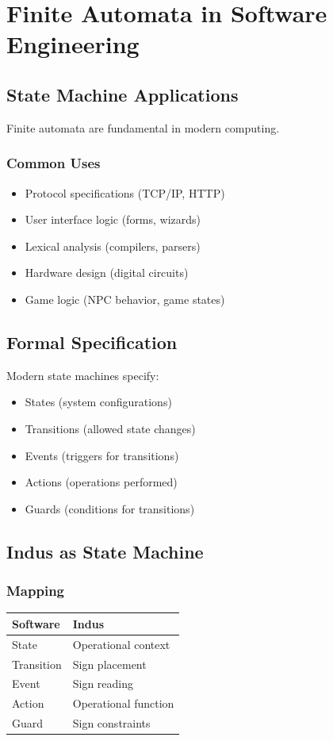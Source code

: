 \section{Finite Automata in Software Engineering}

\subsection{State Machine Applications}

Finite automata are fundamental in modern computing.

\subsubsection{Common Uses}
\begin{itemize}
    \item Protocol specifications (TCP/IP, HTTP)
    \item User interface logic (forms, wizards)
    \item Lexical analysis (compilers, parsers)
    \item Hardware design (digital circuits)
    \item Game logic (NPC behavior, game states)
\end{itemize}

\subsection{Formal Specification}

Modern state machines specify:
\begin{itemize}
    \item States (system configurations)
    \item Transitions (allowed state changes)
    \item Events (triggers for transitions)
    \item Actions (operations performed)
    \item Guards (conditions for transitions)
\end{itemize}

\subsection{Indus as State Machine}

\subsubsection{Mapping}
\begin{center}
\begin{tabular}{ll}
Software & Indus \\
\hline
State & Operational context \\
Transition & Sign placement \\
Event & Sign reading \\
Action & Operational function \\
Guard & Sign constraints \\
\end{tabular}
\end{center}


